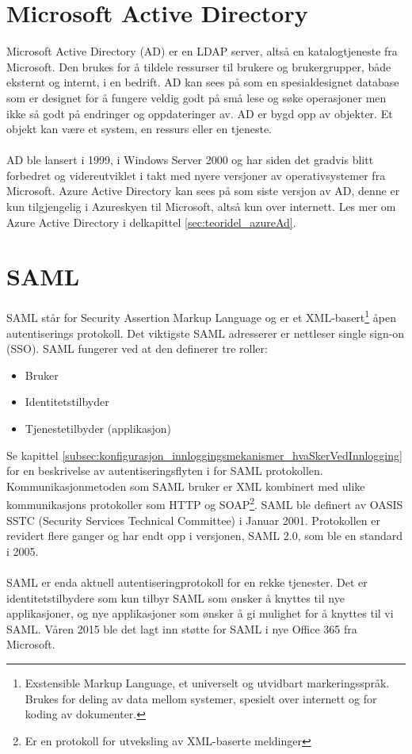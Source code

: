 \section{Microsoft Active Directory}
\label{sec:teoridel_microsoftActiveDirectory}
Microsoft Active Directory (AD) er en LDAP server, altså en katalogtjeneste fra Microsoft. Den brukes for å tildele ressurser til brukere og brukergrupper, både eksternt og internt, i en bedrift. AD kan sees på som en spesialdesignet database som er designet for å fungere veldig godt på små lese og søke operasjoner men ikke så godt på endringer og oppdateringer av. AD er bygd opp av objekter. Et objekt kan være et system, en ressurs eller en tjeneste.\cite{AD}\\
\\
AD ble lansert i 1999, i Windows Server 2000 og har siden det gradvis blitt forbedret og videreutviklet i takt med nyere versjoner av operativsystemer fra Microsoft. Azure Active Directory kan sees på som siste versjon av AD, denne er kun tilgjengelig i Azureskyen til Microsoft, altså kun over internett. Les mer om Azure Active Directory i delkapittel \ref{sec:teoridel_azureAd}.

\section{SAML}
\label{sec:teoridel_SAML}
SAML står for Security Assertion Markup Language og er et XML-basert\footnote{Exstensible Markup Language, et universelt og utvidbart markeringsspråk. Brukes for deling av data mellom systemer, spesielt over internett og for koding av dokumenter.}  åpen autentiserings protokoll. Det viktigste SAML adresserer er nettleser single sign-on (SSO). SAML fungerer ved at den definerer tre roller: 
\begin{itemize}
\item Bruker
\item Identitetstilbyder 
\item Tjenestetilbyder (applikasjon)
\end{itemize}
Se kapittel \ref{subsec:konfigurasjon_innloggingsmekanismer_hvaSkerVedInnlogging} for en beskrivelse av autentiseringsflyten i for SAML protokollen. Kommunikasjonmetoden som SAML bruker er XML kombinert med ulike kommunikasjons protokoller\cite{SAMLProtokoller} som HTTP og SOAP\footnote{Er en protokoll for utveksling av XML-baserte meldinger}. SAML ble definert av OASIS SSTC (Security Services Technical Committee) i Januar 2001\cite{SAMLHist}. Protokollen er revidert flere ganger og har endt opp i versjonen, SAML 2.0, som ble en standard i 2005. \\
\\
SAML er enda aktuell autentiseringprotokoll for en rekke tjenester. Det er identitetstilbydere som kun tilbyr SAML som ønsker å knyttes til nye applikasjoner, og nye applikasjoner som ønsker å gi mulighet for å knyttes til vi SAML. Våren 2015 ble det lagt inn støtte for SAML i nye Office 365 fra Microsoft\cite{SAMLOffice}. 
